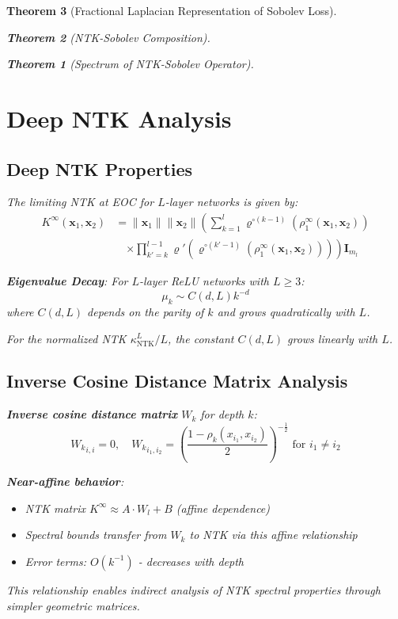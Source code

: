 \documentclass{article}
\newtheorem{theorem}{Theorem}[section]
\begin{document}
\begin{theorem}[Fractional Laplacian Representation of Sobolev Loss]
\begin{theorem}[NTK-Sobolev Composition]
\begin{theorem}[Spectrum of NTK-Sobolev Operator]
\newpage

\section{Deep NTK Analysis}

\subsection{Deep NTK Properties}

The limiting NTK at EOC for $L$-layer networks is given by:
\begin{align}
K^{\infty}(\mathbf{x}_1, \mathbf{x}_2) &= \|\mathbf{x}_1\| \|\mathbf{x}_2\| \left( \sum_{k=1}^l \varrho^{\circ (k-1)}\left(\rho_1^{\infty}(\mathbf{x}_1, \mathbf{x}_2)\right) \right. \\
&\quad \left. \times \prod_{k'=k}^{l-1} \varrho'\left(\varrho^{\circ (k'-1)}\left(\rho_1^{\infty}(\mathbf{x}_1, \mathbf{x}_2)\right)\right) \right) \mathbf{I}_{m_l}
\end{align}

\textbf{Eigenvalue Decay}: For $L$-layer ReLU networks with $L \geq 3$:
\[ \mu_k \sim C(d, L)k^{-d} \]
where $C(d, L)$ depends on the parity of $k$ and grows quadratically with $L$.

For the normalized NTK $\kappa^L_{\text{NTK}}/L$, the constant $C(d, L)$ grows linearly with $L$.

\subsection{Inverse Cosine Distance Matrix Analysis}

\textbf{Inverse cosine distance matrix} $W_k$ for depth $k$:
\[ {W_k}_{i,i} = 0, \quad {W_k}_{i_1,i_2} = \left( \frac{1 - \rho_k(x_{i_1},x_{i_2})}{2} \right)^{-\frac{1}{2}} \text{ for } i_1 \neq i_2 \]

\textbf{Near-affine behavior}:
\begin{itemize}
\item NTK matrix $K^{\infty} \approx A \cdot W_l + B$ (affine dependence)
\item Spectral bounds transfer from $W_k$ to NTK via this affine relationship  
\item Error terms: $O(k^{-1})$ - decreases with depth
\end{itemize}

This relationship enables indirect analysis of NTK spectral properties through simpler geometric matrices.


\end{theorem}
\end{theorem}
\end{theorem}
\end{document}
